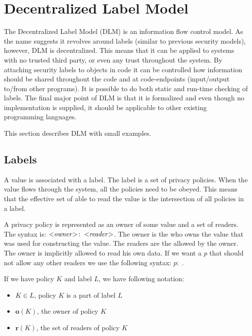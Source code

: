 
\newcommand{\policy}[2]{\ensuremath{#1\!:\;#2}}

\section{Decentralized Label Model}
The Decentralized Label Model (DLM) is an information flow control model.
As the name suggests it revolves around labels (similar to previous security models), however, DLM is decentralized.
This means that it can be applied to systems with no trusted third party, or even any trust throughout the system.
By attaching security labels to objects in code it can be controlled how information should be shared throughout the code and at code-endpoints (input/output to/from other programs).
It is possible to do both static and run-time checking of labels.
The final major point of DLM is that it is formalized and even though no implementation is supplied, it should be applicable to other existing programming languages.

\newcommand{\xvalue}{value}
\newcommand{\xvalues}{values}
This section describes DLM with small examples.

\subsection{Labels}
A \xvalue{} is associated with a label.
The label is a set of privacy policies.
When the \xvalue{} flows through the system, all the policies need to be obeyed.
This means that the effective set of \principals{} able to read the \xvalue{} is the intersection of all policies in a label.

A privacy policy is represented as an owner of some \xvalue{} and a set of readers.
The syntax is: $\policy{\text{<\emph{owner}>}}{\text{<\emph{reader}>}}$.
The owner is the \principal{} who owns the \xvalue{} that was used for constructing the \xvalue{}.
The readers are the \principals{} allowed by the owner.
The owner is implicitly allowed to read his own data.
If we want a \principal{} $p$ that should not allow any other readers we use the following syntax: $\policy{p}{}$.

If we have policy $K$ and label $L$, we have following notation:
\begin{itemize}
\item $K \in L$, policy $K$ is a part of label $L$
\item $\textbf{o}(K)$, the owner of policy $K$
\item $\textbf{r}(K)$, the set of readers of policy $K$
\end{itemize}

